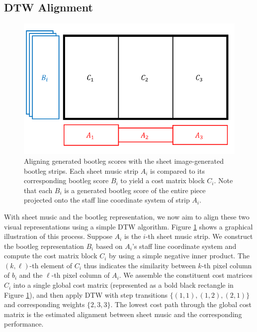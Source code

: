 \documentclass[letterpaper, 10pt, conference]{ieeeconf}  %
\begin{document}
\subsection{DTW Alignment}

\begin{figure}
    \centering
    \includegraphics[scale=0.45]{images/dtw.PNG}
    \caption{Aligning generated bootleg scores with the sheet image-generated bootleg strips. Each sheet music strip $A_i$ is compared to its corresponding bootleg score $B_i$ to yield a cost matrix block $C_i$. Note that each $B_i$ is a generated bootleg score of the entire piece projected onto the staff line coordinate system of strip $A_i$.}
    \label{fig:dtw}
\end{figure}

With sheet music and the bootleg representation, we now aim to align these two visual representations using a simple DTW algorithm. Figure \ref{fig:dtw} shows a graphical illustration of this process. Suppose $A_i$ is the $i$-th sheet music strip. We construct the bootleg representation $B_i$ based on $A_i$'s staff line coordinate system and compute the cost matrix block $C_i$ by using a simple negative inner product. The $(k,\ell)$-th element of $C_i$ thus indicates the similarity between $k$-th pixel column of $b_i$ and the $\ell$-th pixel column of $A_i$. We assemble the constituent cost matrices $C_i$ into a single global cost matrix (represented as a bold black rectangle in Figure \ref{fig:dtw}), and then apply DTW with step transitions $\{(1, 1), (1, 2), (2, 1)\}$ and corresponding weights $\{2,3,3\}$. The lowest cost path through the global cost matrix is the estimated alignment between sheet music and the corresponding performance.
\end{document}
